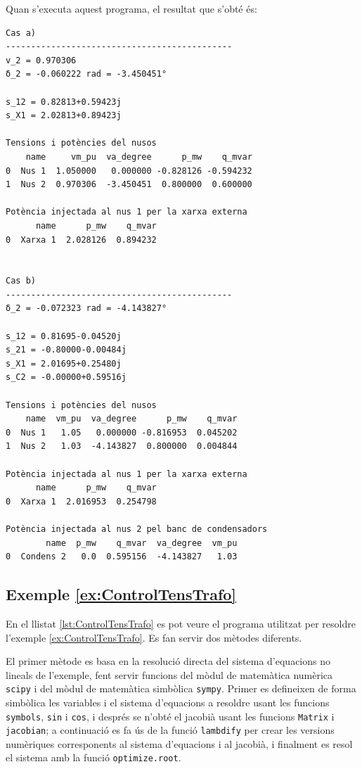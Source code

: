 Quan s'executa aquest programa, el resultat que s'obté és:
\lstset{
	language=,
	numbers=none,
	frame=none
}
\begin{lstlisting}
Cas a)
---------------------------------------------
v_2 = 0.970306
δ_2 = -0.060222 rad = -3.450451°

s_12 = 0.82813+0.59423j
s_X1 = 2.02813+0.89423j

Tensions i potències del nusos
    name     vm_pu  va_degree      p_mw    q_mvar
0  Nus 1  1.050000   0.000000 -0.828126 -0.594232
1  Nus 2  0.970306  -3.450451  0.800000  0.600000

Potència injectada al nus 1 per la xarxa externa
      name      p_mw    q_mvar
0  Xarxa 1  2.028126  0.894232


Cas b)
---------------------------------------------
δ_2 = -0.072323 rad = -4.143827°

s_12 = 0.81695-0.04520j
s_21 = -0.80000-0.00484j
s_X1 = 2.01695+0.25480j
s_C2 = -0.00000+0.59516j

Tensions i potències del nusos
    name  vm_pu  va_degree      p_mw    q_mvar
0  Nus 1   1.05   0.000000 -0.816953  0.045202
1  Nus 2   1.03  -4.143827  0.800000  0.004844

Potència injectada al nus 1 per la xarxa externa
      name      p_mw    q_mvar
0  Xarxa 1  2.016953  0.254798

Potència injectada al nus 2 pel banc de condensadors
        name  p_mw    q_mvar  va_degree  vm_pu
0  Condens 2   0.0  0.595156  -4.143827   1.03
\end{lstlisting} 


\hypertarget{exemple:ControlTensTrafo}{\subsection{Exemple \ref*{ex:ControlTensTrafo} \ControlTensTrafo}}
En el llistat \vref{lst:ControlTensTrafo} es pot veure el programa utilitzat per resoldre l'exemple \vref{ex:ControlTensTrafo}. Es fan servir dos mètodes diferents.

El primer mètode es basa en la resolució directa del sistema d'equacions no lineals de l'exemple, fent servir funcions  del mòdul de matemàtica numèrica \texttt{scipy} i del mòdul de matemàtica simbòlica \texttt{sympy}. Primer es defineixen de forma simbòlica les variables i el sistema d'equacions a resoldre usant les funcions \texttt{symbols}, \texttt{sin} i \texttt{cos}, i després se n'obté el jacobià usant les funcions \texttt{Matrix} i \texttt{jacobian}; a continuació es fa ús de la funció  \texttt{lambdify} per crear les versions numèriques corresponents al sistema d'equacions i al jacobià, i finalment es resol el sistema amb la funció \texttt{optimize.root}.

